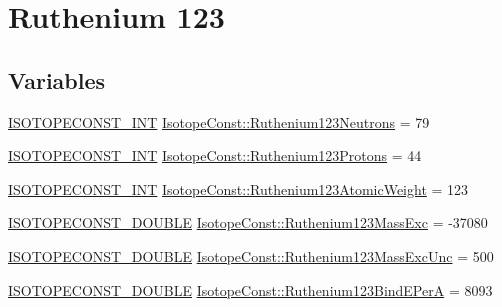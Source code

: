 \hypertarget{group___isotope_const-_ruthenium-_ru123}{}\section{Ruthenium 123}
\label{group___isotope_const-_ruthenium-_ru123}
\subsection*{Variables}
\begin{DoxyCompactItemize}
\item 
\mbox{\hyperlink{group___isotope_const-_macros_ga5f18360b3e99483a35c32d789e62621c}{I\+S\+O\+T\+O\+P\+E\+C\+O\+N\+S\+T\+\_\+\+I\+NT}} \mbox{\hyperlink{group___isotope_const-_ruthenium-_ru123_ga8ba076750e2d9471b3b7532e889312af}{Isotope\+Const\+::\+Ruthenium123\+Neutrons}} = 79
\item 
\mbox{\hyperlink{group___isotope_const-_macros_ga5f18360b3e99483a35c32d789e62621c}{I\+S\+O\+T\+O\+P\+E\+C\+O\+N\+S\+T\+\_\+\+I\+NT}} \mbox{\hyperlink{group___isotope_const-_ruthenium-_ru123_ga447eb5d8f749dfd7ebbdecec0ecae517}{Isotope\+Const\+::\+Ruthenium123\+Protons}} = 44
\item 
\mbox{\hyperlink{group___isotope_const-_macros_ga5f18360b3e99483a35c32d789e62621c}{I\+S\+O\+T\+O\+P\+E\+C\+O\+N\+S\+T\+\_\+\+I\+NT}} \mbox{\hyperlink{group___isotope_const-_ruthenium-_ru123_ga0a5f65d764e83d8196297a0f21efc7a5}{Isotope\+Const\+::\+Ruthenium123\+Atomic\+Weight}} = 123
\item 
\mbox{\hyperlink{group___isotope_const-_macros_ga8f45a7272ce02c0b4c65c44636ed719a}{I\+S\+O\+T\+O\+P\+E\+C\+O\+N\+S\+T\+\_\+\+D\+O\+U\+B\+LE}} \mbox{\hyperlink{group___isotope_const-_ruthenium-_ru123_ga4f33f8902af2f5fe60c373e549bb91c2}{Isotope\+Const\+::\+Ruthenium123\+Mass\+Exc}} = -\/37080
\item 
\mbox{\hyperlink{group___isotope_const-_macros_ga8f45a7272ce02c0b4c65c44636ed719a}{I\+S\+O\+T\+O\+P\+E\+C\+O\+N\+S\+T\+\_\+\+D\+O\+U\+B\+LE}} \mbox{\hyperlink{group___isotope_const-_ruthenium-_ru123_ga67358aeaf44cf215e24e3c6438c0e787}{Isotope\+Const\+::\+Ruthenium123\+Mass\+Exc\+Unc}} = 500
\item 
\mbox{\hyperlink{group___isotope_const-_macros_ga8f45a7272ce02c0b4c65c44636ed719a}{I\+S\+O\+T\+O\+P\+E\+C\+O\+N\+S\+T\+\_\+\+D\+O\+U\+B\+LE}} \mbox{\hyperlink{group___isotope_const-_ruthenium-_ru123_ga1194b89058b991ad6af0344cf6aca732}{Isotope\+Const\+::\+Ruthenium123\+Bind\+E\+PerA}} = 8093
\item 

\end{DoxyCompactItemize}

